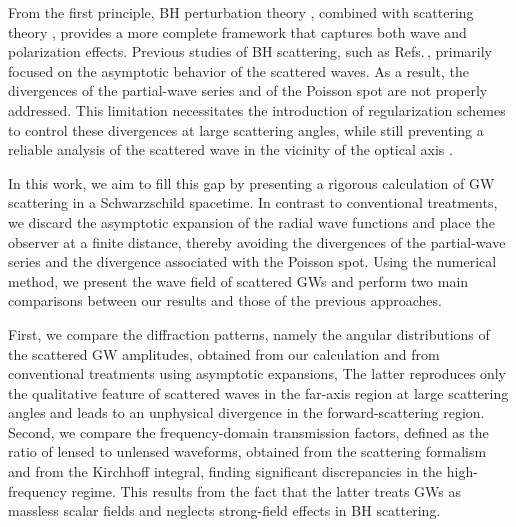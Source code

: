 \documentclass[reprint,amsmath,amssymb,aps,prd]{revtex4-2}
\begin{document}
From the first principle, BH perturbation theory \cite{Regge_Wheeler_1957,Zerilli_1970a,Zerilli_1970b,Teukolsky_1973,Press_1973,Bardeen_1973,Teukolsky_1974,Chandrasekhar_1978a,Chandrasekhar_1978b,Sasaki_Nakamura_1982}, combined with scattering theory \cite{Matzner_1968,Fabbri_1975,Chrzanowski_1976,Sanchez_1978a,Sanchez_1978b,Sanchez_1976,Handler_Matzner_1980,Andersson_1995,Glampedakis_2001,Dolan_2008a,Dolan_2008b,Bao_2022}, provides a more complete framework that captures both wave and polarization effects. Previous studies of BH scattering, such as Refs.\,\cite{Dolan_2008a,Dolan_2008b}, primarily focused on the asymptotic behavior of the scattered waves. As a result, the divergences of the partial-wave series and of the Poisson spot are not properly addressed. This limitation necessitates the introduction of regularization schemes \cite{Yennie_1954,Stratton_2020,Folacci_2019a,Folacci_2019b,Pijnenburg_2024a} to control these divergences at large scattering angles, while still preventing a reliable analysis of the scattered wave in the vicinity of the optical axis \cite{Pijnenburg_2024b,Chan_2025,Saketh_2025,Zhang_Fan_2021,Li_2025_b}.

In this work, we aim to fill this gap by presenting a rigorous calculation of GW scattering in a Schwarzschild spacetime. In contrast to conventional treatments, we discard the asymptotic expansion of the radial wave functions and place the observer at a finite distance, thereby avoiding the divergences of the partial-wave series and the divergence associated with the Poisson spot. Using the numerical method, we present the wave field of scattered GWs and perform two main comparisons between our results and those of the previous approaches. 

First, we compare the diffraction patterns, namely the angular distributions of the scattered GW amplitudes, obtained from our calculation and from conventional treatments using asymptotic expansions, 
The latter reproduces only the qualitative feature of scattered waves in the far-axis region at large scattering angles and leads to an unphysical divergence in the forward-scattering region. Second, we compare the frequency-domain transmission factors, defined as the ratio of lensed to unlensed waveforms, obtained from the scattering formalism and from the Kirchhoff integral, finding significant discrepancies in the high-frequency regime. This results from the fact that the latter treats GWs as massless scalar fields and neglects strong-field effects in BH scattering.
\end{document}
